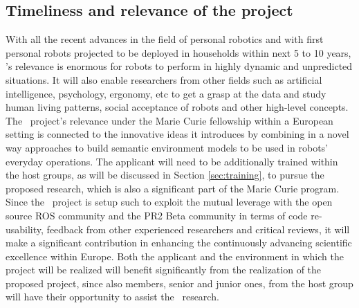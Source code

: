 \subsection{Timeliness and relevance of the project}
With all the recent advances in the field of personal robotics and with first
personal robots projected to be deployed in households within next 5 to 10 years, 
\ksem's relevance is enormous for robots to perform in highly dynamic and unpredicted
situations. It will also enable researchers from other fields such as artificial intelligence, 
psychology, ergonomy, etc to get a grasp at the data and study human living patterns, 
social acceptance of robots and other high-level concepts.
The \ksem\ project's relevance under the Marie Curie fellowship within a European 
setting is connected to the innovative ideas it introduces by combining in a novel way 
approaches to build semantic environment models to be used in robots' everyday operations.
The applicant will need to be additionally trained within the host groups, as will be discussed in Section 
\ref{sec:training}, to pursue the proposed research, which is also a significant part of the Marie Curie program.
Since the \ksem\ project is setup such to exploit the mutual leverage with the open source ROS 
community and the PR2 Beta community 
in terms of code re-usability, feedback from other experienced researchers and critical reviews, 
it will make a significant contribution in enhancing the continuously advancing scientific excellence within Europe. 
Both the applicant and the  environment in which the project will be realized will benefit significantly from the 
realization of the proposed project, since also members, senior and junior ones, from the 
host group will have their opportunity to assist the \ksem\ research. \\

